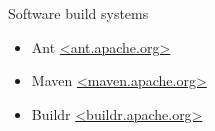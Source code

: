 \documentclass[8pt]{beamer}
\begin{document}
\begin{frame}[fragile]{}
\begin{columns}
\begin{column}{0.33\textwidth}
\begin{block}{Software build systems}
\begin{itemize}
          \begin{itemize}
          \item Ant \url{<ant.apache.org>}
          \item Maven \url{<maven.apache.org>}
          \item Buildr \url{<buildr.apache.org>}
          \end{itemize}
        \end{itemize}
      \end{block}
    \end{column}
  \end{columns}
\end{frame}

\end{document}
